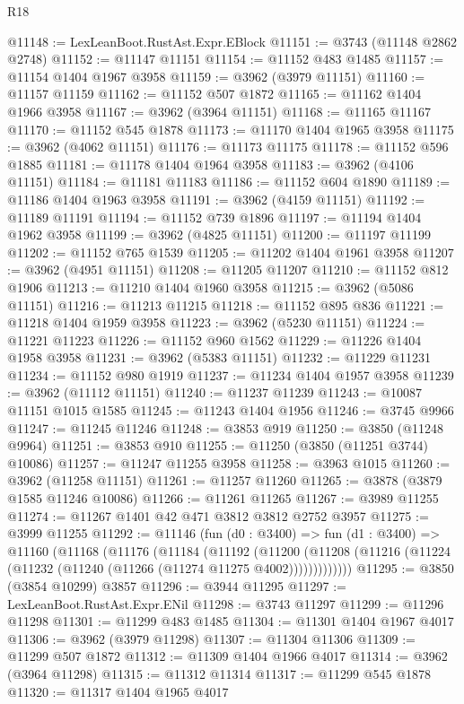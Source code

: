 \begin{lexlean}{R18}
\begin{coremodule}
@11148 := LexLeanBoot.RustAst.Expr.EBlock
@11151 := @3743 (@11148 @2862 @2748)
@11152 := @11147 @11151
@11154 := @11152 @483 @1485
@11157 := @11154 @1404 @1967 @3958
@11159 := @3962 (@3979 @11151)
@11160 := @11157 @11159
@11162 := @11152 @507 @1872
@11165 := @11162 @1404 @1966 @3958
@11167 := @3962 (@3964 @11151)
@11168 := @11165 @11167
@11170 := @11152 @545 @1878
@11173 := @11170 @1404 @1965 @3958
@11175 := @3962 (@4062 @11151)
@11176 := @11173 @11175
@11178 := @11152 @596 @1885
@11181 := @11178 @1404 @1964 @3958
@11183 := @3962 (@4106 @11151)
@11184 := @11181 @11183
@11186 := @11152 @604 @1890
@11189 := @11186 @1404 @1963 @3958
@11191 := @3962 (@4159 @11151)
@11192 := @11189 @11191
@11194 := @11152 @739 @1896
@11197 := @11194 @1404 @1962 @3958
@11199 := @3962 (@4825 @11151)
@11200 := @11197 @11199
@11202 := @11152 @765 @1539
@11205 := @11202 @1404 @1961 @3958
@11207 := @3962 (@4951 @11151)
@11208 := @11205 @11207
@11210 := @11152 @812 @1906
@11213 := @11210 @1404 @1960 @3958
@11215 := @3962 (@5086 @11151)
@11216 := @11213 @11215
@11218 := @11152 @895 @836
@11221 := @11218 @1404 @1959 @3958
@11223 := @3962 (@5230 @11151)
@11224 := @11221 @11223
@11226 := @11152 @960 @1562
@11229 := @11226 @1404 @1958 @3958
@11231 := @3962 (@5383 @11151)
@11232 := @11229 @11231
@11234 := @11152 @980 @1919
@11237 := @11234 @1404 @1957 @3958
@11239 := @3962 (@11112 @11151)
@11240 := @11237 @11239
@11243 := @10087 @11151 @1015 @1585
@11245 := @11243 @1404 @1956
@11246 := @3745 @9966
@11247 := @11245 @11246
@11248 := @3853 @919
@11250 := @3850 (@11248 @9964)
@11251 := @3853 @910
@11255 := @11250 (@3850 (@11251 @3744) @10086)
@11257 := @11247 @11255 @3958
@11258 := @3963 @1015
@11260 := @3962 (@11258 @11151)
@11261 := @11257 @11260
@11265 := @3878 (@3879 @1585 @11246 @10086)
@11266 := @11261 @11265
@11267 := @3989 @11255
@11274 := @11267 @1401 @42 @471 @3812 @3812 @2752 @3957
@11275 := @3999 @11255
@11292 := @11146
    (fun (d0 : @3400) =>
    fun (d1 : @3400) =>
    @11160
      (@11168
        (@11176
          (@11184
            (@11192
              (@11200
                (@11208 (@11216 (@11224 (@11232 (@11240 (@11266 (@11274 @11275 @4002)))))))))))))
@11295 := @3850 (@3854 @10299) @3857
@11296 := @3944 @11295
@11297 := LexLeanBoot.RustAst.Expr.ENil
@11298 := @3743 @11297
@11299 := @11296 @11298
@11301 := @11299 @483 @1485
@11304 := @11301 @1404 @1967 @4017
@11306 := @3962 (@3979 @11298)
@11307 := @11304 @11306
@11309 := @11299 @507 @1872
@11312 := @11309 @1404 @1966 @4017
@11314 := @3962 (@3964 @11298)
@11315 := @11312 @11314
@11317 := @11299 @545 @1878
@11320 := @11317 @1404 @1965 @4017

\end{coremodule}
\end{lexlean}
